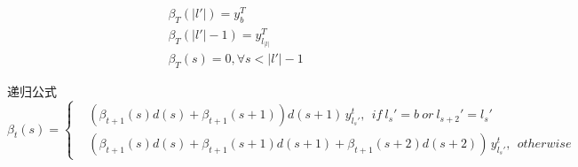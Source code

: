 \documentclass[winfonts]{njuthesis}
\begin{document}
\begin{equation}
\begin{aligned}
&\beta_T(|l{}'|)=y_{b}^{T}\\
&\beta_T(|l{}'|-1)=y_{l_|l|}^{T} \\
&\beta_T(s)=0, \forall s < |l{}'|-1
\end{aligned}
\end{equation}

递归公式
\begin{equation}
\beta_t(s)=\left\{
\begin{aligned}
& (\beta_{t+1}(s) d(s)+\beta_{t+1}(s+1))d(s+1)\,  y_{l_s{}'}^t, \: \: if \:  l_s{}'=b \:  or \:  l_{s+2}{}'=l_s{}'\\
& (\beta_{t+1}(s) d(s)+\beta_{t+1}(s+1)d(s+1)+\beta_{t+1}(s+2)d(s+2))\,  y_{l_s{}'}^t,\: \:   otherwise
\end{aligned}
\right.
\end{equation}


%
%

%

\end{document}
